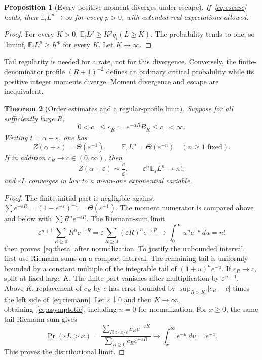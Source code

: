 \documentclass[11pt]{article}
\newtheorem{theorem}{Theorem}[section]
\newtheorem{proposition}[theorem]{Proposition}
\theoremstyle{definition}
\newcommand{\E}{\mathbb E}
\newcommand{\eps}{\varepsilon}
\begin{document}
\begin{proposition}[Every positive moment diverges under escape]
\label{prop:moment-divergence}
If~\eqref{eq:escape} holds, then $\E_i L^p\to\infty$ for every $p>0$, with extended-real expectations allowed.
\end{proposition}
\begin{proof}
For every $K>0$, $\E_i L^p\geq K^p q_i(L\geq K)$.
The probability tends to one, so $\liminf_i\E_i L^p\geq K^p$ for every $K$.
Let $K\to\infty$.
\end{proof}

Tail regularity is needed for a rate, not for this divergence.
Conversely, the finite-denominator profile $(R+1)^{-2}$ defines an ordinary critical probability while its positive integer moments diverge.
Moment divergence and escape are inequivalent.

\begin{theorem}[Order estimates and a regular-profile limit]
\label{thm:rates}
Suppose for all sufficiently large $R$,
\begin{equation}
 0<c_-\leq c_R:=e^{-\alpha R}B_R\leq c_+<\infty.
 \label{eq:two-sided}
\end{equation}
Writing $t=\alpha+\eps$, one has
\begin{equation}
 Z(\alpha+\eps)=\Theta(\eps^{-1}),\qquad
 \E_\eps L^n=\Theta(\eps^{-n})
 \quad(n\geq1\text{ fixed}).
 \label{eq:theta}
\end{equation}
If in addition $c_R\to c\in(0,\infty)$, then
\begin{equation}
 Z(\alpha+\eps)\sim\frac c\eps,
 \qquad \eps^n\E_\eps L^n\longrightarrow n!,
 \label{eq:asymptotic}
\end{equation}
and $\eps L$ converges in law to a mean-one exponential variable.
\end{theorem}
\begin{proof}
The finite initial part is negligible against
$\sum e^{-\eps R}=(1-e^{-\eps})^{-1}=\Theta(\eps^{-1})$.
The moment numerator is compared above and below with $\sum R^n e^{-\eps R}$.
The Riemann-sum limit
\begin{equation}
 \eps^{n+1}\sum_{R\geq0}R^n e^{-\eps R}
 =\eps\sum_{R\geq0}(\eps R)^n e^{-\eps R}
 \longrightarrow\int_0^\infty u^n e^{-u}\,du=n!
 \label{eq:riemann}
\end{equation}
then proves~\eqref{eq:theta} after normalization.
To justify the unbounded interval, first use Riemann sums on a compact interval.
The remaining tail is uniformly bounded by a constant multiple of the integrable tail of $(1+u)^n e^{-u}$.
If $c_R\to c$, split at fixed large $K$.
The finite part vanishes after multiplication by $\eps^{n+1}$.
Above $K$, replacement of $c_R$ by $c$ has error bounded by
$\sup_{R>K}|c_R-c|$ times the left side of~\eqref{eq:riemann}.
Let $\eps\downarrow0$ and then $K\to\infty$, obtaining~\eqref{eq:asymptotic}, including $n=0$ for normalization.
For $x\geq0$, the same tail Riemann sum gives
\begin{equation}
 \Pr_\eps(\eps L>x)=
 \frac{\sum_{R>x/\eps}c_R e^{-\eps R}}
 {\sum_{R\geq0}c_R e^{-\eps R}}
 \longrightarrow\int_x^\infty e^{-u}\,du=e^{-x}.
\end{equation}
This proves the distributional limit.
\end{proof}
\end{document}
